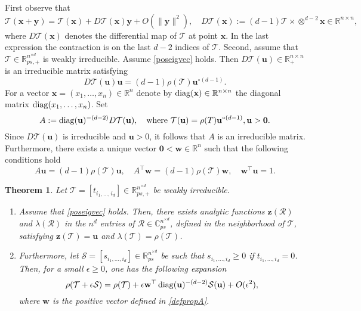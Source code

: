 \documentclass{amsart}
\newcommand{\differential}{D}
\newcommand{\diag}{\operatorname{diag}}
\newcommand{\C}{\mathbb{C}}
\newcommand{\R}{\mathbb{R}}
\newcommand{\uu}{\mathbf{u}}
\newcommand{\w}{\mathbf{w}}
\newcommand{\x}{\mathbf{x}}
\newcommand{\y}{\mathbf{y}}
\newcommand{\z}{\mathbf{z}}
\newcommand{\0}{\mathbf{0}}
\newcommand{\1}{\mathbf{1}}
\newcommand{\cR}{\mathcal{R}}
\newcommand{\cS}{\mathcal{S}}
\newcommand{\cT}{\mathcal{T}}
\def\diag{\mathop{{\rm diag}}\nolimits}
\newcommand{\trans}{^\top}
\newtheorem{theorem}[theo]{Theorem}
\theoremstyle{remark}
\numberwithin{equation}{section} %
\renewcommand{\ge}{\geqslant}
\begin{document}
 First observe that
 \begin{equation}\label{partderT}
 \cT(\x+\y)=\cT(\x)+\differential \cT(\x)\y + O(\|\y\|^2), \quad \differential \cT(\x):=(d-1)\cT\times \otimes^{d-2}\x \in \R^{n\times n},
 \end{equation}
where $\differential \cT(\x)$ denotes the differential map of $\cT$ at point
$\x$.
%
 In the last expression the contraction is on the last $d-2$ indices of $\cT$.
 Second, assume that $\cT\in\R_{ps,+}^{n^{\times d}}$ is weakly irreducible.  Assume \eqref{poseigvec} holds.  Then $\differential\cT(\uu)\in \R_+^{n\times n}$
 is an irreducible matrix satisfying
 \begin{equation}\label{pratTuid}
 \differential\cT(\uu)\uu=(d-1)\rho(\cT)\uu^{\circ(d-1)}.
 \end{equation}
 For a vector $\x=(x_1,\ldots,x_n)\in \R^n$ denote by $\diag(\x)\in \R^{n\times n}$  the diagonal matrix $\diag(x_1,\ldots,x_n)$. Set
 \begin{equation}\label{defATu} 
 A:=\diag(\uu)^{-(d-2)}\differential\cT(\uu), \quad\textrm{where }\cT(\uu)=\rho(T)\uu^{\circ (d-1)}, \uu>\0.
 \end{equation}
 Since $\differential\cT(\uu)$ is irreducible and $\uu>0$, it follows that $A$ is an irreducible matrix.  Furthermore, there exists a unique vector $\0<\w\in\R^n$ such that the following conditions hold
 \begin{equation}\label{defpropA}
 A\uu=(d-1)\rho(\cT)\uu, \quad A\trans\w=(d-1)\rho(\cT)\w,\quad\w\trans \uu=1.
 \end{equation}
 \begin{theorem}\label{pertspecrad}  Let $\cT=[t_{i_1,\ldots,i_d}]\in\R_{ps,+}^{n^{\times d}}$ be weakly irreducible.  
\begin{enumerate}
\item Assume that \eqref{poseigvec} holds. Then,
there exists analytic functions
 $\z(\cR)$ and $\lambda(\cR)$ in the $n^d$ entries of $\cR\in\C^{n^{\times d}}_{ps}$, defined in the neighborhood of $\cT$,
satisfying $\z(\cT)=\uu$ and $\lambda(\cT)=\rho(\cT)$.
\item
Furthermore, let $\cS=[s_{i_1,\ldots,i_d}]\in \R^{n^{\times d}}_{ps}$ be such that $s_{i_1,\ldots,i_d}\ge 0$ if $t_{i_1,\ldots,i_d}=0$.  Then, for a small $\epsilon\ge 0$, one has the following expansion
 \begin{equation}\label{rhoTpert}
 \rho(\cT+\epsilon\cS)=\rho(\cT)+\epsilon \w\trans \diag(\uu)^{-(d-2)}\cS(\uu) +O(\epsilon^2),
 \end{equation}
 where $\w$ is the positive vector defined in \eqref{defpropA}.
\end{enumerate}
 \end{theorem}
\end{document}
